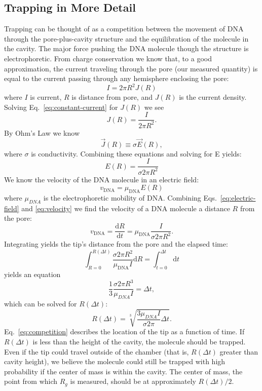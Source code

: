 \documentclass[aps,prl,preprint,groupedaddress]{revtex4}
\begin{document}
\subsection{Trapping in More Detail}

Trapping can be thought of as a competition between the movement of DNA through the pore-plus-cavity structure and the equilibration of the molecule in the cavity.
The major force pushing the DNA molecule though the structure is electrophoretic.
From charge conservation we know that, to a good approximation, the current traveling through the pore (our measured quantity) is equal to the current passing through any hemisphere enclosing the pore: 
\begin{equation} I = 2 \pi R^2 J(R) \label{eq:constant-current}\end{equation} 
where \(I\) is current, \(R\) is distance from pore, and \(J(R)\) is the current density.
Solving Eq.~\ref{eq:constant-current} for \(J(R)\) we see 
\[J(R) = \frac{I}{2 \pi R^2}.\] 
By Ohm's Law we know 
\[\overrightarrow{J}(R) \equiv \sigma \overrightarrow{E}(R),\]
where \(\sigma\) is conductivity.
Combining these equations and solving for E yields:
\begin{equation} E(R) = \frac{I}{\sigma 2 \pi R^2} \label{eq:electric-field} \end{equation} 
We know the velocity of the DNA molecule in an electric field: 
\begin{equation} v_{\mathrm{DNA}} = \mu_{\mathrm{DNA}} E(R) \label{eq:velocity} \end{equation} 
where \(\mu_{DNA}\) is the electrophoretic mobility of DNA.
Combining Eqs.~\ref{eq:electric-field} and \ref{eq:velocity} we find the velocity of a DNA molecule a distance $R$ from the pore:
\begin{equation} v_{\mathrm{DNA}} = \frac{\mathrm{d}R}{\mathrm{d}t} = \mu_{\mathrm{DNA}} \frac{I}{\sigma 2 \pi R^2}. \end{equation}
Integrating yields the tip's distance from the pore and the elapsed time:
\begin{equation}\int_{R=0}^{R(\Delta t)} \frac{\sigma 2 \pi R^2}{\mu_{\mathrm{DNA}} I} \mathrm{d}R = \int_{t=0}^{\Delta t} \mathrm{d}t \end{equation}
yields an equation
\begin{equation}\frac{1}{3} \frac{\sigma 2 \pi R^3}{\mu_{DNA} I} = \Delta t,\end{equation}
which can be solved for \(R(\Delta t)\):
\begin{equation} R(\Delta t) = \sqrt[3]{\frac{3 \mu_{DNA} I}{\sigma 2 \pi}\Delta t} .\label{eq:competition}\end{equation}
Eq.~\ref{eq:competition} describes the location of the tip as a function of time.
If \(R(\Delta t)\) is less than the height of the cavity, the molecule should be trapped.
Even if the tip could travel outside of the chamber (that is, \(R(\Delta t)\) greater than cavity height), we believe the molecule could still be trapped with high probability if the center of mass is within the cavity.
The center of mass, the point from which \(R_g\) is measured, should be at approximately \(R(\Delta t)/2\).
\end{document}

